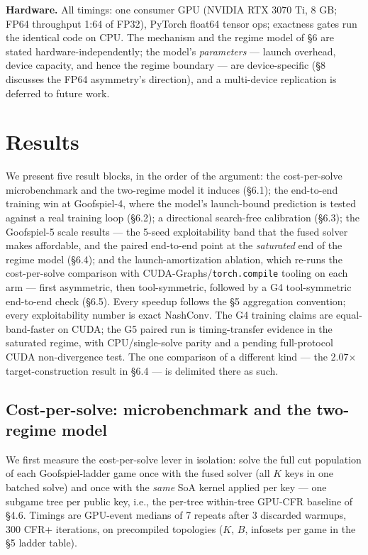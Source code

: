 \documentclass[11pt]{article}
\begin{document}
\textbf{Hardware.} All timings: one consumer GPU (NVIDIA RTX 3070 Ti, 8 GB; FP64
throughput 1:64 of FP32), PyTorch float64 tensor ops; exactness gates run the identical
code on CPU. The mechanism and the regime model of \S6 are stated
hardware-independently; the model's \emph{parameters} --- launch overhead, device
capacity, and hence the regime boundary --- are device-specific (\S8 discusses the FP64
asymmetry's direction), and a multi-device replication is deferred to future work.

\section{Results}

We present five result blocks, in the order of the argument: the cost-per-solve microbenchmark
and the two-regime model it induces (\S6.1); the end-to-end training win at Goofspiel-4,
where the model's launch-bound prediction is tested against a real training loop
(\S6.2); a directional search-free calibration (\S6.3); the Goofspiel-5 scale
results --- the 5-seed exploitability band that the fused solver makes affordable, and
the paired end-to-end point at the \emph{saturated} end of the regime model (\S6.4);
and the launch-amortization ablation, which re-runs the cost-per-solve comparison with
CUDA-Graphs/\texttt{torch.compile} tooling on each arm --- first asymmetric, then
tool-symmetric, followed by a G4 tool-symmetric end-to-end check (\S6.5).
Every speedup follows the \S5 aggregation convention; every exploitability number is
exact NashConv. The G4 training claims are equal-band-faster on CUDA; the G5 paired run
is timing-transfer evidence in the saturated regime, with CPU/single-solve parity and a
pending full-protocol CUDA non-divergence test. The one comparison of a different kind
--- the 2.07$\times$ target-construction result in \S6.4 --- is delimited there as such.

\subsection{Cost-per-solve: microbenchmark and the two-regime model}

We first measure the cost-per-solve lever in isolation: solve the full cut population of
each Goofspiel-ladder game once with the fused solver (all $K$ keys in one batched
solve) and once with the \emph{same} SoA kernel applied per key --- one subgame tree per
public key, i.e., the per-tree within-tree GPU-CFR baseline of \S4.6. Timings are
GPU-event medians of 7 repeats after 3 discarded warmups, 300 CFR+ iterations, on
precompiled topologies ($K$, $B$, infosets per game in the \S5 ladder table).
\end{document}
